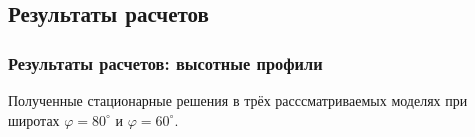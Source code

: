 \documentclass[9pt, apectratio=43,unicode]{beamer}
\begin{document}
\subsection{Результаты расчетов}
\begin{frame}\frametitle{Результаты расчетов: высотные профили}

Полученные стационарные решения в трёх расссматриваемых моделях при широтах $\varphi = 80^\circ$ и $\varphi = 60^\circ$.

\begin{figure}[H]
\begin{minipage}[c]{0.490\linewidth}
\flushleft
{}
\end{minipage}
\hfill
\begin{minipage}[c]{0.490\linewidth}
\flushleft
{}
\end{minipage}
\end{figure}

\end{frame}
\end{document}
